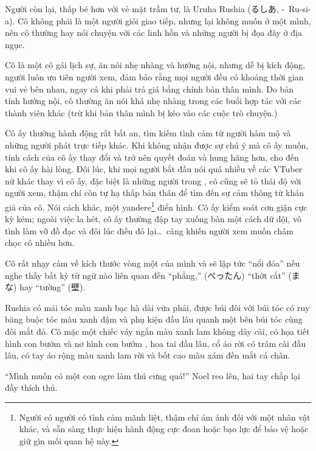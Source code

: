 \documentclass[../main.tex]{subfiles}
\begin{document}
\chrint


Người còn lại, thấp bé hơn với vẻ mặt trầm tư, là Uruha Rushia (るしあ, -\ Ru-si-a). Cô không phải là một người giỏi giao tiếp, nhưng lại không muốn ở một mình, nên cô thường hay nói chuyện với các linh hồn và những người bị đọa đày ở địa ngục.

Cô là một cô gái lịch sự, ăn nói nhẹ nhàng và hướng nội, nhưng dễ bị kích động, người luôn ưu tiên người xem, đảm bảo rằng mọi người đều có khoảng thời gian vui vẻ bên nhau, ngay cả khi phải trả giá bằng chính bản thân mình. Do bản tính hướng nội, cô thường ăn nói khá nhẹ nhàng trong các buổi hợp tác với các thành viên khác (trừ khi bản thân mình bị kéo vào các cuộc trò chuyện.)

Cô ấy thường hành động rất bất an, tìm kiếm tình cảm từ người hâm mộ và những người phát trực tiếp khác. Khi không nhận được sự chú ý mà cô ấy muốn, tính cách của cô ấy thay đổi và trở nên quyết đoán và hung hăng hơn, cho đến khi cô ấy hài lòng. Đôi lúc, khi mọi người bắt đầu nói quá nhiều về các VTuber nữ khác thay vì cô ấy, đặc biệt là những người trong \hll, cô cũng sẽ tỏ thái độ với người xem, thậm chí còn tự hạ thấp bản thân để tìm đến sự cảm thông từ khán giả của cô. Nói cách khác, một yandere\footnote{Người có người có tình cảm mãnh liệt, thậm chí ám ảnh đối với một nhân vật khác, và sẵn sàng thực hiện hành động cực đoan hoặc bạo lực để bảo vệ hoặc giữ gìn mối quan hệ này.} điển hình. Cô ấy kiểm soát cơn giận cực kỳ kém; ngoài việc la hét, cô ấy thường đập tay xuống bàn một cách dữ dội, vô tình làm vỡ đồ đạc và đôi lúc điều đó lại\dots\ càng khiến người xem muốn châm chọc cô nhiều hơn.

Cô rất nhạy cảm về kích thước vòng một của mình và sẽ lập tức ``nổi đóa'' nếu nghe thấy bất kỳ từ ngữ nào liên quan đến ``phẳng,'' (ぺったん) ``thớt cắt'' (まな) hay ``tường'' (壁).

Rushia có mái tóc màu xanh bạc hà dài vừa phải, được búi đôi với búi tóc có ruy băng buộc tóc màu xanh đậm và phụ kiện đầu lâu quanh một bên búi tóc cùng đôi mắt đỏ. Cô mặc một chiếc váy ngắn màu xanh lam không dây cài, có họa tiết hình con bướm và nơ hình con bướm , hoa tai đầu lâu, cổ áo rời có trâm cài đầu lâu, có tay áo rộng màu xanh lam rời và bốt cao màu xám đến mắt cá chân.

\chrint

``Mình muốn có một con ogre làm thú cưng quá!'' Noel reo lên, hai tay chắp lại đầy thích thú.
\end{document}
